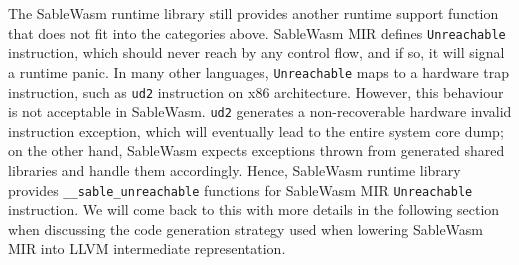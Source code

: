 The SableWasm runtime library still provides another runtime support function that does not fit into the categories above. SableWasm MIR defines \texttt{Unreachable} instruction, which should never reach by any control flow, and if so, it will signal a runtime panic. In many other languages, \texttt{Unreachable} maps to a hardware trap instruction, such as \texttt{ud2} instruction on x86 architecture. However, this behaviour is not acceptable in SableWasm. \texttt{ud2} generates a non-recoverable hardware invalid instruction exception, which will eventually lead to the entire system core dump; on the other hand, SableWasm expects exceptions thrown from generated shared libraries and handle them accordingly. Hence, SableWasm runtime library provides \texttt{\_\_sable\_unreachable} functions for SableWasm MIR \texttt{Unreachable} instruction. We will come back to this with more details in the following section when discussing the code generation strategy used when lowering SableWasm MIR into LLVM intermediate representation.